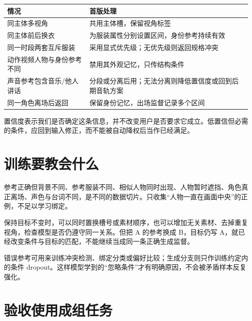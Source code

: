 {\def\LTcaptype{table} %
\small\setlength{\tabcolsep}{3pt}\renewcommand{\arraystretch}{1.18}
\begin{longtable}[]{@{}
  >{\raggedright\arraybackslash}p{}
  >{\raggedright\arraybackslash}p{}@{}}
\toprule\noalign{}
\begin{minipage}[b]{\linewidth}\raggedright
情况
\end{minipage} & \begin{minipage}[b]{\linewidth}\raggedright
首版处理
\end{minipage} \\
\midrule\noalign{}
\endhead
\bottomrule\noalign{}
\endlastfoot
同主体多视角 & 共用主体槽，保留视角标签 \\
同主体前后换衣 & 为服装属性分别设置区间，身份参考持续有效 \\
同一时段两套互斥服装 & 采用显式优先级；无优先级则返回规格冲突 \\
动作视频人物与身份参考不同 & 禁用其外观记忆，只传结构条件 \\
声音参考包含音乐/他人讲话 & 分段或分离后用；无法分离则降低置信度或回到后期音轨方案 \\
同一角色离场后返回 & 保留身份记忆，出场监督记录多个区间 \\
\end{longtable}
}

置信度表示我们是否确定这条信息，并不改变用户是否要求它成立。低置信但必需的条件，应回到输入修正，而不能被自动降权后当作已经满足。

\section{训练要教会什么}\label{seedance-m22-ux8badux7ec3ux8981ux6559ux4f1aux4ec0ux4e48}

参考正确但背景不同、参考服装不同、相似人物同时出现、人物暂时遮挡、角色真正离场、声色与台词不同，是不同的数据切片。只收集``人物一直在画面中央''的正例，不足以学习绑定。

保持目标不变时，可以同时置换槽号或素材顺序，也可以增加无关素材、去掉重复视角，检查模型是否仍遵守同一关系。但把 A 的参考换成 B，目标仍写 A，就已经改变条件与目标的匹配，不能继续当成同一条正确生成监督。

错误参考可用来训练冲突检测、绑定分类或偏好比较；生成分支则只作训练约定内的条件 dropout。这样模型学到的“忽略条件”才有明确原因，不会被矛盾样本反复强化。

\section{验收使用成组任务}\label{seedance-m22-ux9a8cux6536ux4f7fux7528ux6210ux7ec4ux4efbux52a1}

